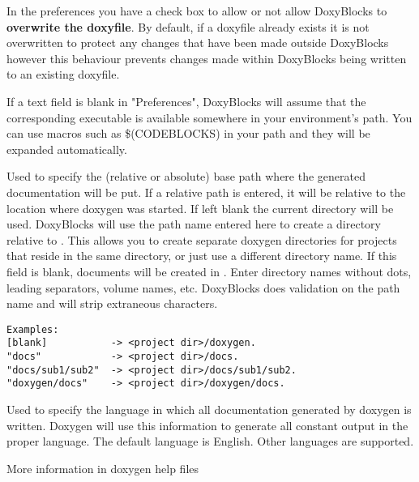 \begin{description}
\item In the preferences you have a check box to allow or not allow DoxyBlocks to \textbf{overwrite the doxyfile}. By default, if a doxyfile already exists it is not overwritten to protect any changes that have been made outside DoxyBlocks however this behaviour prevents changes made within DoxyBlocks being written to an existing doxyfile.
\item If a text field is blank in "Preferences", DoxyBlocks will assume that the corresponding executable is available somewhere in your environment's path. You can use macros such as \$(CODEBLOCKS) in your path and they will be expanded automatically.
\item [OUTPUT\_DIRECTORY] Used to specify the (relative or absolute) base path where the generated documentation will be put. If a relative path is entered, it will be relative to the location where doxygen was started. If left blank the current directory will be used. DoxyBlocks will use the path name entered here to create a directory relative to . This allows you to create separate doxygen directories for projects that reside in the same directory, or just use a different directory name. If this field is blank, documents will be created in . Enter directory names without dots, leading separators, volume names, etc. DoxyBlocks does validation on the path name and will strip extraneous characters.
\begin{lstlisting}
Examples:
[blank]           -> <project dir>/doxygen.
"docs"            -> <project dir>/docs.
"docs/sub1/sub2"  -> <project dir>/docs/sub1/sub2.
"doxygen/docs"    -> <project dir>/doxygen/docs.
\end{lstlisting}
\item [OUTPUT\_LANGUAGE] Used to specify the language in which all documentation generated by doxygen is written. Doxygen will use this information to generate all constant output in the proper language. The default language is English. Other languages are supported. 
\item More information in doxygen help files
\end{description}